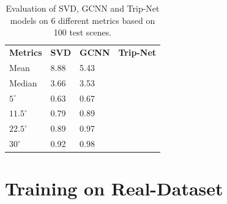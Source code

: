 \documentclass[border=15pt, multi, tikz]{article}
\newcommand{\tabhead}[1]{\textbf{#1}}
\begin{document}
\begin{table}[H]
	\centering
	\begin{tabular}{l l l l }
		\tabhead{Metrics} & \tabhead{SVD} & \tabhead{GCNN} & \tabhead{Trip-Net} \\
		Mean  					& 8.88 & 5.43 & \\ 
		\hline
		Median					& 3.66 & 3.53 & \\ 
		\hline
		$ 5^\circ $ 			& 0.63 & 0.67 & \\
		\hline
		$ 11.5^\circ $ 			& 0.79 & 0.89 & \\
		\hline
		$ 22.5^\circ $ 			& 0.89 & 0.97 & \\
		\hline
		$ 30^\circ $ 			& 0.92 & 0.98 & \\
	\end{tabular}
	\caption{Evaluation of SVD, GCNN and Trip-Net models on 6 different metrics based on 100 test scenes.}	
	\label{tab:high_resolution_eval}
\end{table}


\section{Training on Real-Dataset}
\end{document}
